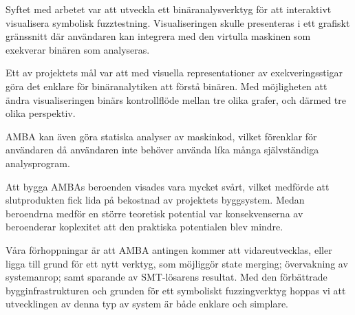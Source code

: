 Syftet med arbetet var att utveckla ett binäranalysverktyg för att interaktivt
visualisera symbolisk fuzztestning. Visualiseringen skulle presenteras i ett
grafiskt gränssnitt där användaren kan integrera med den virtulla maskinen som
exekverar binären som analyseras.

Ett av projektets mål var att med visuella representationer av exekveringsstigar
göra det enklare för binäranalytiken att förstå binären. Med möjligheten att
ändra visualiseringen binärs kontrollflöde mellan tre olika grafer, och därmed
tre olika perspektiv.

AMBA kan även göra statiska analyser av maskinkod, vilket förenklar för
användaren då användaren inte behöver använda líka många självständiga
analysprogram.

Att bygga AMBAs beroenden visades vara mycket svårt, vilket medförde att
slutprodukten fick lida på bekostnad av projektets byggsystem. Medan beroendrna
medför en större teoretisk potential var konsekvenserna av beroenderar
koplexitet att den praktiska potentialen blev mindre.

Våra förhoppningar är att AMBA antingen kommer att vidareutvecklas, eller ligga
till grund för ett nytt verktyg, som möjliggör state merging; övervakning av
systemanrop; samt sparande av SMT-lösarens resultat. Med den förbättrade
bygginfrastrukturen och grunden för ett symboliskt fuzzingverktyg hoppas vi att
utvecklingen av denna typ av system är både enklare och simplare.
